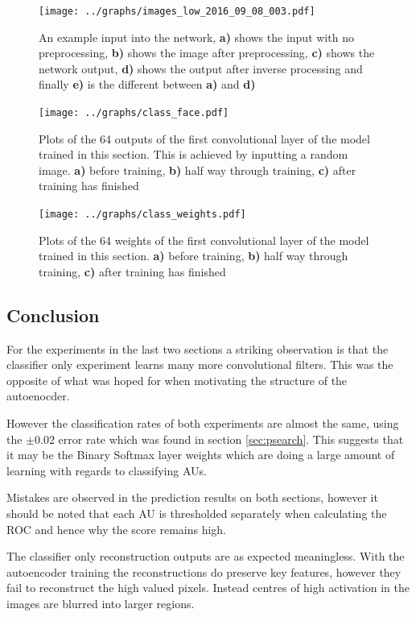         \begin{figure}[!h]
        \centering
        \texttt{[image: ../graphs/images\_low\_2016\_09\_08\_003.pdf]}
        \caption{An example input into the network, {\bf a)} shows the input with no preprocessing,
        {\bf b)} shows the image after preprocessing, {\bf c)} shows the network output, {\bf d)} shows the output after inverse processing
        and finally {\bf e)} is the different between {\bf a)} and {\bf d)}} \label{fig:recon4}
        \end{figure}

        \begin{figure}[!h]\label{fig:TODODOODOO6DO}
        \centering
        \texttt{[image: ../graphs/class\_face.pdf]}
        \caption{Plots of the 64 outputs of the first convolutional layer of the model trained in this section.
        This is achieved by inputting a random image.
        {\bf a)} before training,
        {\bf b)} half way through training,
        {\bf c)} after training has finished
        }
        \end{figure}

        \begin{figure}[!h]\label{fig:TODODO4ODOODO}
        \centering
        \texttt{[image: ../graphs/class\_weights.pdf]}
        \caption{Plots of the 64 weights of the first convolutional layer of the model trained in this section.
        {\bf a)} before training,
        {\bf b)} half way through training,
        {\bf c)} after training has finished
        }
        \end{figure}
      \clearpage
      \subsection{Conclusion}
        For the experiments in the last two sections a striking observation is that
        the classifier only experiment learns many more convolutional filters.
        This was the opposite of what was hoped for when motivating the structure
        of the autoenocder.

        However the classification rates of both experiments are almost the same,
        using the $\pm 0.02$ error rate which was found in section \ref{sec:psearch}.
        This suggests that it may be the Binary Softmax layer weights which are doing
        a large amount of learning with regards to classifying AUs.

        Mistakes are observed in the prediction results on both sections, however it should be noted
        that each AU is thresholded separately when calculating the ROC and hence why the
        score remains high.

        The classifier only reconstruction outputs are as expected meaningless.
        With the autoencoder training the reconstructions do preserve key features,
        however they fail to reconstruct the high valued pixels. Instead centres of high activation
        in the images are blurred into larger regions.
